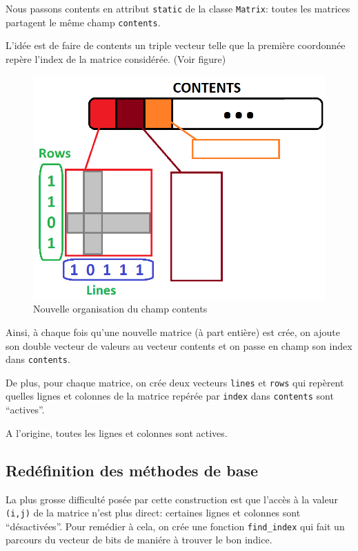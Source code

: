 \documentclass[a4paper,11pt]{article}
\begin{document}
Nous passons contents en attribut \texttt{static} de la classe \texttt{Matrix}: toutes les matrices partagent le même champ \texttt{contents}.

L'idée est de faire de contents un triple vecteur telle que la première coordonnée repère l'index de la matrice considérée. (Voir figure)

\begin{figure}
  \centering
  \includegraphics[scale=0.5]{matimpli.png}
  \caption{Nouvelle organisation du champ contents}
  \label{fig:phd}
\end{figure}

Ainsi, à chaque fois qu'une nouvelle matrice (à part entière) est crée, on ajoute son double vecteur de valeurs au vecteur contents et on passe en champ son index dans \texttt{contents}.

De plus, pour chaque matrice, on crée deux vecteurs \texttt{lines} et \texttt{rows} qui repèrent quelles lignes et colonnes de la matrice repérée par \texttt{index} dans \texttt{contents} sont ``actives''.

A l'origine, toutes les lignes et colonnes sont actives.

\subsection{Redéfinition des méthodes de base}

La plus grosse difficulté posée par cette construction est que l'accès à la valeur \texttt{(i,j)} de la matrice n'est plus direct: certaines lignes et colonnes sont ``désactivées''. 
Pour remédier à cela, on crée une fonction \texttt{find\_index} qui fait un parcours du vecteur de bits de maniére à trouver le bon indice.
\end{document}
